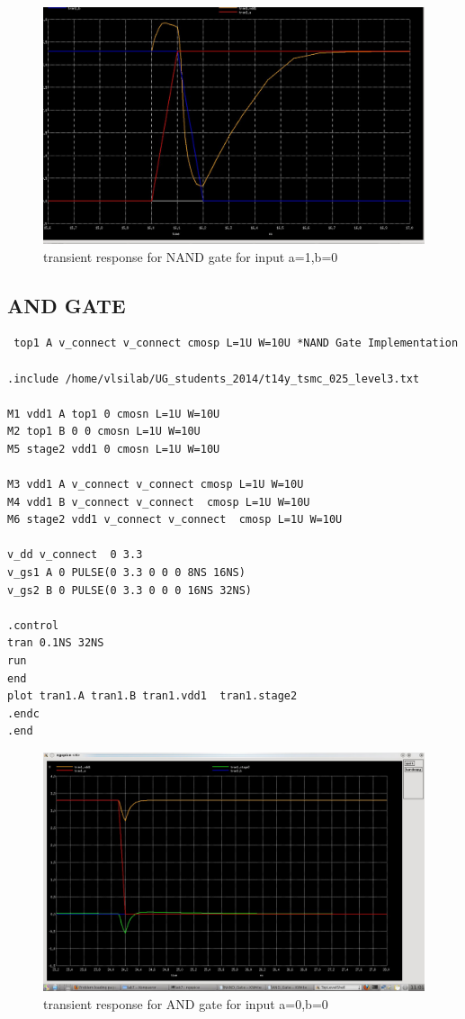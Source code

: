 \documentclass[12pt,a4paper]{article}
\begin{document}
\begin{center}
\clearpage
\begin{figure}[h]
\centering
\includegraphics[scale=.4]{NAND_Gate_10.jpeg}
\caption[Short]{transient response for NAND gate for input a=1,b=0 }
\end{figure}

\subsection{AND GATE}
\begin{lstlisting}
 top1 A v_connect v_connect cmosp L=1U W=10U *NAND Gate Implementation

.include /home/vlsilab/UG_students_2014/t14y_tsmc_025_level3.txt

M1 vdd1 A top1 0 cmosn L=1U W=10U
M2 top1 B 0 0 cmosn L=1U W=10U
M5 stage2 vdd1 0 cmosn L=1U W=10U

M3 vdd1 A v_connect v_connect cmosp L=1U W=10U 
M4 vdd1 B v_connect v_connect  cmosp L=1U W=10U
M6 stage2 vdd1 v_connect v_connect  cmosp L=1U W=10U

v_dd v_connect  0 3.3
v_gs1 A 0 PULSE(0 3.3 0 0 0 8NS 16NS)
v_gs2 B 0 PULSE(0 3.3 0 0 0 16NS 32NS)

.control
tran 0.1NS 32NS
run
end
plot tran1.A tran1.B tran1.vdd1  tran1.stage2
.endc
.end 
\end{lstlisting}

\begin{figure}[h]
\centering
\includegraphics[scale=.4]{AND_Gate_00.jpeg}
\caption[Short]{transient response for AND gate for input a=0,b=0 }
\end{figure}
 

\end{center}
\end{document}
